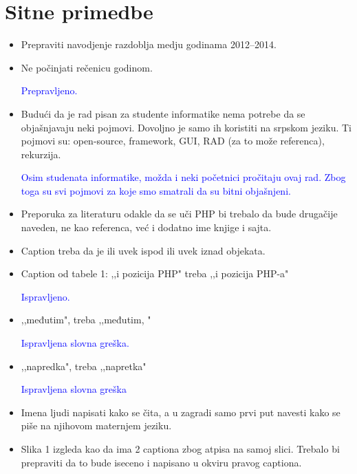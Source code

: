 \documentclass[a4paper]{report}
\newcommand{\odgovor}[1]{\textcolor{blue}{#1}}
\begin{document}
\section{Sitne primedbe}
\begin{itemize}
\item Prepraviti navodjenje razdoblja medju godinama 2012--2014.
\item Ne počinjati rečenicu godinom.

\odgovor{Prepravljeno.}

\item Budući da je rad pisan za studente informatike nema potrebe da se objašnjavaju neki pojmovi. Dovoljno je samo ih koristiti na srpskom jeziku. Ti pojmovi su: open-source, framework, GUI, RAD (za to može referenca), rekurzija.

\odgovor{Osim studenata informatike, možda i neki početnici pročitaju ovaj rad. Zbog toga su svi pojmovi za koje smo smatrali da su bitni objašnjeni.}

\item Preporuka za literaturu odakle da se uči PHP bi trebalo da bude drugačije naveden, ne kao referenca, već i dodatno ime knjige i sajta.

\odgovor{}

\item Caption treba da je ili uvek ispod ili uvek iznad objekata.

\odgovor{}

\item Caption od tabele 1: ,,i pozicija PHP" treba ,,i pozicija PHP-a"

\odgovor{Ispravljeno.}

\item ,,međutim", treba ,,međutim, "

\odgovor{Ispravljena slovna greška.}
 
\item ,,napredka", treba ,,napretka"

\odgovor{Ispravljena slovna greška}

\item Imena ljudi napisati kako se čita, a u zagradi samo prvi put navesti kako se piše na njihovom maternjem jeziku.

\odgovor{}

\item Slika 1 izgleda kao da ima 2 captiona zbog atpisa na samoj slici. Trebalo bi prepraviti da to bude iseceno i napisano u okviru pravog captiona.


\end{itemize}
\end{document}
